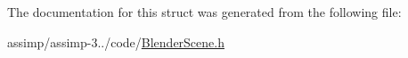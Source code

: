 The documentation for this struct was generated from the following file\+:\begin{DoxyCompactItemize}
\item 
assimp/assimp-\/3../code/\hyperlink{_blender_scene_8h}{Blender\+Scene.\+h}\end{DoxyCompactItemize}
